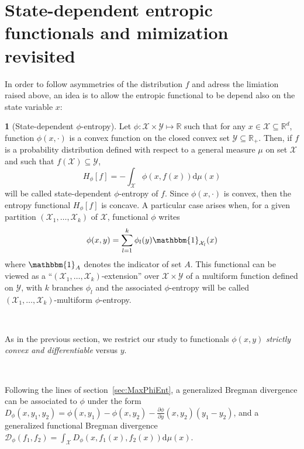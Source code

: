 \documentclass[english,sort&compress]{elsarticle}
\theoremstyle{definition}
\newtheorem{defn}{\protect\definitionname}
\theoremstyle{plain}
\theoremstyle{plain}
\providecommand{\definitionname}{Definition}
\def\dmu{\mathrm{d}\mu}
\def\fD{\mathcal{D}}
\def\Rset{\mathbb{R}}
\def\X{\mathcal{X}}
\def\Y{\mathcal{Y}}
\def\un{\mathbbm{1}}
\begin{document}

\section{State-dependent entropic functionals and mimization revisited}
\label{sec:MultiformEnt}

In order to follow asymmetries of  the distribution $f$ and adress the limiation
raised above, an idea  is to allow the entropic functional to  be depend also on
the state variable $x$:
%
\begin{defn}[State-dependent $\phi$-entropy]\label{def:asym_phi-entropy}
  Let $\phi: \X \times  \Y \mapsto \Rset$ such that for any  $x \in \X \subseteq
  \Rset^d$, function $\phi(x,\cdot)$  is a convex function on  the closed convex
  set  $\Y \subseteq  \Rset_+$.   Then,  if $f$  is  a probability  distribution
  defined with  respect to  a general measure  $\mu$ on  set $\X$ and  such that
  $f(\X) \subseteq \Y$,
  \begin{equation}\label{eq:asym_phi-entropy}
    H_\phi[f] = - \int_\X \phi(x,f(x)) \dmu(x)
  \end{equation}
  will be  called state-dependent $\phi$-entropy of  $f$.  Since $\phi(x,\cdot)$
  is convex, then the entropy functional $H_\phi[f]$ is concave.
  A particular case arises when, for  a given partition $(\X_1 , \ldots , \X_k)$
  of $\X$, functional $\phi$ writes
  \begin{equation}\label{eq:multiform_phi-entropy}
    \phi(x,y) = \sum_{l=1}^k \phi_l(y) \un_{\X_l}(x)
  \end{equation}
  where $\un_A$ denotes the indicator of set $A$.  This functional can be viewed
  as a ``$(\X_1 , \ldots , \X_k)$-extension'' over $\X \times \Y$ of a multiform
  function  defined on  $\Y$,  with  $k$ branches  $\phi_l$  and the  associated
  $\phi$-entropy   will   be  called   $(\X_1   ,   \ldots  ,   \X_k)$-multiform
  $\phi$-entropy.
\end{defn}

\

As in  the previous  section, we restrict  our study to  functionals $\phi(x,y)$
{\em strictly convex and differentiable} versus $y$.

\

Following  the  lines  of  section~\ref{sec:MaxPhiEnt},  a  generalized  Bregman
divergence  can be  associated to  $\phi$  under the  form $D_\phi(x,y_1,y_2)  =
\phi(x,y_1) - \phi(x,y_2) - \frac{\partial \phi}{\partial y}(x,y_2) \left( y_1 -
  y_2 \right)$,  and a generalized functional  Bregman divergence $\displaystyle
\fD_\phi(f_1,f_2) = \int_\X D_\phi(x,f_1(x),f_2(x)) \dmu(x)$.
\end{document}
